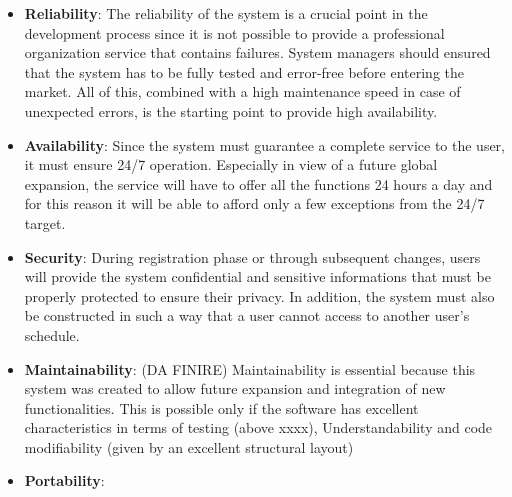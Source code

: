 \begin{itemize}
	\item \textbf{Reliability}: The reliability of the system is a crucial point in the development process since it is not possible to provide a professional organization service that contains failures. System managers should ensured that the system has to be fully tested and error-free before entering the market. All of this, combined with a high maintenance speed in case of unexpected errors, is the starting point to provide high availability.
	\item \textbf{Availability}: Since the system must guarantee a complete service to the user, it must ensure 24/7 operation. Especially in view of a future global expansion, the service will have to offer all the functions 24 hours a day and for this reason it will be able to afford only a few exceptions from the 24/7 target. 
	\item \textbf{Security}: During registration phase or through subsequent changes, users will provide the system confidential and sensitive informations that must be properly protected to ensure their privacy. In addition, the system must also be constructed in such a way that a user cannot access to another user's schedule.
	\item \textbf{Maintainability}: (DA FINIRE) Maintainability is essential because this system was created to allow future expansion and integration of new functionalities. This is possible only if the software has excellent characteristics in terms of testing (above xxxx), Understandability and code modifiability (given by an excellent structural layout) 
	\item \textbf{Portability}:
\end{itemize}